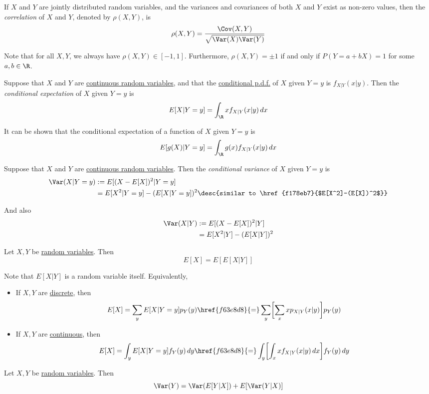 \label{a34f96d}

If $X$ and $Y$ are jointly distributed random variables, and the variances and
covariances of both $X$ and $Y$ exist as non-zero values, then the
\textit{correlation} of $X$ and $Y$, denoted by $\rho(X,Y)$, is
$$
  \rho(X,Y)=\frac{\Cov(X,Y)}{\sqrt{\Var(X)\Var(Y)}}
$$

Note that for all $X,Y$, we always have $\rho(X,Y)\in[-1,1]$. Furthermore,
$\rho(X,Y)=\pm1$ if and only if $P(Y=a+bX)=1$ for some $a,b\in\R$.

\label{f63e8d8}

Suppose that $X$ and $Y$ are \href{bdb1e15}{continuous random variables}, and
that the \href{be663f1}{conditional p.d.f.} of $X$ given $Y=y$ is
$f_{X|Y}(x|y)$. Then the \textit{conditional expectation} of $X$ given $Y=y$ is
$$
  E[X|Y=y]=\int_\R xf_{X|Y}(x|y)\,dx
$$

It can be shown that the conditional expectation of a function of $X$ given
$Y=y$ is
$$
  E[g(X)|Y=y]=\int_\R g(x)f_{X|Y}(x|y)\,dx
$$

\label{b773615}

Suppose that $X$ and $Y$ are \href{bdb1e15}{continuous random variables}. Then
the \textit{conditional variance} of $X$ given $Y=y$ is
\begin{align*}
  \Var(X|Y=y) &:=E[(X-E[X])^2|Y=y]                                                         \\
              &=E[X^2|Y=y]-(E[X|Y=y])^2\desc{similar to \href{f178eb7}{$E[X^2]-(E[X])^2$}}
\end{align*}

And also
\begin{align*}
  \Var(X|Y) &:=E[(X-E[X])^2|Y]    \\
            &=E[X^2|Y]-(E[X|Y])^2
\end{align*}

\label{f021fea}

Let $X,Y$ be \href{b96960b}{random variables}. Then
$$
  E[X]=E[E[X|Y]]
$$

Note that $E[X|Y]$ is a random variable itself. Equivalently,
\begin{itemize}
  \item If $X,Y$ are \href{f831030}{discrete}, then
        $$
          E[X]=\sum_yE[X|Y=y]p_Y(y)\href{f63e8d8}{=}\sum_y\biggl[\sum_xxp_{X|Y}(x|y)\biggr]p_Y(y)
        $$
  \item If $X,Y$ are \href{bdb1e15}{continuous}, then
        $$
          E[X]=\int_yE[X|Y=y]f_Y(y)\,dy\href{f63e8d8}{=}\int_y\biggl[\int_xxf_{X|Y}(x|y)\,dx\biggr]f_Y(y)\,dy
        $$
\end{itemize}

\label{cd3954e}

Let $X,Y$ be \href{b96960b}{random variables}. Then
$$
  \Var(Y)=\Var(E[Y|X])+E[\Var(Y|X)]
$$
